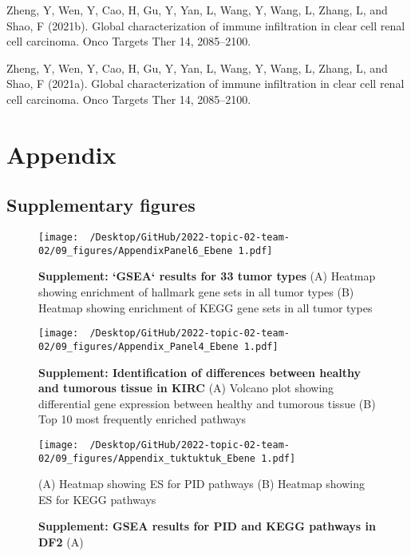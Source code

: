 \documentclass[
  parskip,
  oneside]{scrreprt}
\newlength{\cslhangindent}
\newlength{\cslentryspacingunit} %
\newenvironment{CSLReferences}[2] %
 {%
  \setlength{\parindent}{0pt}
  \ifodd #1
  \let\oldpar\par
  \def\par{\hangindent=\cslhangindent\oldpar}
  \fi
  \setlength{\parskip}{#2\cslentryspacingunit}
 }%
 {}
\begin{document}
\begin{CSLReferences}{0}{0}
\leavevmode{}%
Zheng, Y, Wen, Y, Cao, H, Gu, Y, Yan, L, Wang, Y, Wang, L, Zhang, L, and
Shao, F (2021b). Global characterization of immune infiltration in clear
cell renal cell carcinoma. Onco Targets Ther 14, 2085--2100.

\leavevmode{}%
Zheng, Y, Wen, Y, Cao, H, Gu, Y, Yan, L, Wang, Y, Wang, L, Zhang, L, and
Shao, F (2021a). Global characterization of immune infiltration in clear
cell renal cell carcinoma. Onco Targets Ther 14, 2085--2100.

\end{CSLReferences}

\hypertarget{appendix}{%
\chapter{Appendix}\label{appendix}}

\hypertarget{supplementary-figures}{%
\section{Supplementary figures}\label{supplementary-figures}}

\begin{figure}[h]
  \texttt{[image: ~/Desktop/GitHub/2022-topic-02-team-02/09\_figures/AppendixPanel6\_Ebene 1.pdf]}
  \caption{\textbf{Supplement: `GSEA` results for 33 tumor types} (A) Heatmap showing enrichment of hallmark gene sets in all tumor types (B) Heatmap showing enrichment of KEGG gene sets in all tumor types}
  \label{hmap}
\end{figure}

\begin{figure}[h]
 \begin{center}
   \texttt{[image: ~/Desktop/GitHub/2022-topic-02-team-02/09\_figures/Appendix\_Panel4\_Ebene 1.pdf]}
  \end{center}
  \caption{\textbf{Supplement: Identification of differences between healthy and tumorous tissue in KIRC } (A) Volcano plot showing differential gene expression between healthy and tumorous tissue (B) Top 10 most frequently enriched pathways}
  \label{volcanoap}
\end{figure}

\begin{figure}[h]
 \begin{center}
   \texttt{[image: ~/Desktop/GitHub/2022-topic-02-team-02/09\_figures/Appendix\_tuktuktuk\_Ebene 1.pdf]}
  \end{center}
  \caption{\textbf{Supplement: GSEA results for PID and KEGG pathways in DF2 } (A) } (A) Heatmap showing ES for PID pathways (B) Heatmap showing ES for KEGG pathways
  \label{tuk}
\end{figure}
\end{document}
